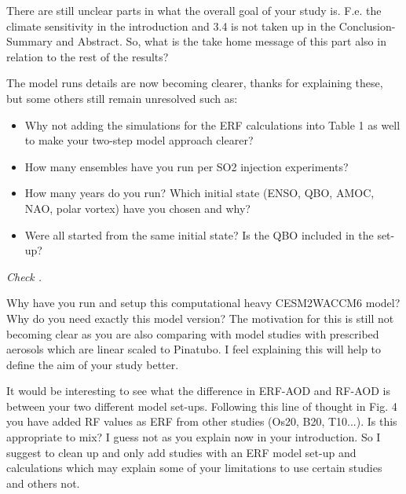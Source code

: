 \documentclass{reviewresponse}
\let\citeA\shortciteA %
\begin{document}
  \begin{revcomment}[colframe={colorcommentresolved}]
    There are still unclear parts in what the overall goal of your study is. F.e. the
    climate sensitivity in the introduction and 3.4 is not taken up in the
    Conclusion-Summary and Abstract. So, what is the take home message of this part also
    in relation to the rest of the results?
  \end{revcomment}
  \begin{revcomment}[colframe={colorcommentresolved}]
    The model runs details are now becoming clearer, thanks for explaining these, but
    some others still remain unresolved such as:

    \begin{itemize}[noitemsep]
      \item
      Why not adding the simulations for the ERF calculations into Table 1 as well to
      make your two-step model approach clearer?
      \item
      How many ensembles have you run per SO2 injection experiments?
      \item
      How many years do you run? Which initial state (ENSO, QBO, AMOC, NAO, polar
      vortex) have you chosen and why?
      \item
      Were all started from the same initial state? Is the QBO included in the set-up?
    \end{itemize}
  \end{revcomment}
  \begin{revresponse}
    \emph{Check \citeA{toohey2014}.}
  \end{revresponse}
  \begin{revcomment}[colframe={colorcommentresolved}]
    Why have you run and setup this computational heavy CESM2WACCM6 model? Why do you
    need exactly this model version? The motivation for this is still not becoming clear
    as you are also comparing with model studies with prescribed aerosols which are
    linear scaled to Pinatubo. I feel explaining this will help to define the aim of
    your study better.
  \end{revcomment}
  \begin{revcomment}[colframe={colorcommentresolved}]
    It would be interesting to see what the difference in ERF-AOD and RF-AOD is between
    your two different model set-ups. Following this line of thought in Fig. 4 you have
    added RF values as ERF from other studies (Os20, B20, T10...). Is this appropriate
    to mix? I guess not as you explain now in your introduction. So I suggest to clean
    up and only add studies with an ERF model set-up and calculations which may explain
    some of your limitations to use certain studies and others not.
  \end{revcomment}
\end{document}
